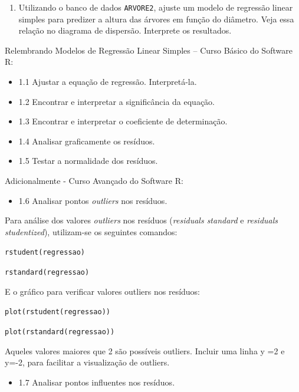 \documentclass[12pt,brazil,oneside]{book}
\providecommand{\tightlist}{%
  \setlength{\itemsep}{0pt}\setlength{\parskip}{0pt}}
\begin{document}
\begin{enumerate}
\def\labelenumi{\arabic{enumi})}
\tightlist
\item
  Utilizando o banco de dados \texttt{ARVORE2}, ajuste um modelo de
  regressão linear simples para predizer a altura das árvores em função
  do diâmetro. Veja essa relação no diagrama de dispersão. Interprete os
  resultados.
\end{enumerate}

Relembrando Modelos de Regressão Linear Simples -- Curso Básico do
Software R:

\begin{itemize}
\tightlist
\item
  1.1 Ajustar a equação de regressão. Interpretá-la.
\item
  1.2 Encontrar e interpretar a significância da equação.
\item
  1.3 Encontrar e interpretar o coeficiente de determinação.
\item
  1.4 Analisar graficamente os resíduos.
\item
  1.5 Testar a normalidade dos resíduos.
\end{itemize}

Adicionalmente - Curso Avançado do Software R:

\begin{itemize}
\tightlist
\item
  1.6 Analisar pontos \emph{outliers} nos resíduos.
\end{itemize}

Para análise dos valores \emph{outliers} nos resíduos (\emph{residuals
standard} e \emph{residuals studentized}), utilizam-se os seguintes
comandos:

\texttt{rstudent(regressao)}

\texttt{rstandard(regressao)}

E o gráfico para verificar valores outliers nos resíduos:

\texttt{plot(rstudent(regressao))}

\texttt{plot(rstandard(regressao))}

Aqueles valores maiores que \textbar{}2\textbar{} são possíveis
outliers. Incluir uma linha y =2 e y=-2, para facilitar a visualização
de outliers.

\begin{itemize}
\tightlist
\item
  1.7 Analisar pontos influentes nos resíduos.
\end{itemize}
\end{document}

